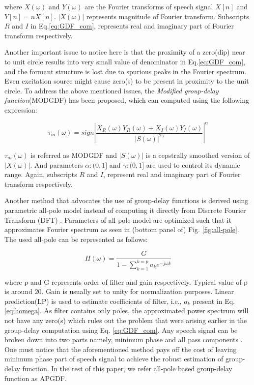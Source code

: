 \documentclass[conference]{IEEEtran}
\begin{document}
where $X(\omega)$ and $Y(\omega)$ are the Fourier transforms of speech signal $X[n]$ and $Y[n] = nX[n]$. $|X(\omega)|$ represents magnitude of Fourier transform. Subscripts $R$ and $I$ in Eq.\ref{eq:GDF_com}, represents real and imaginary part of Fourier transform respectively. 

Another important issue to notice here is that the proximity of a zero(dip) near to unit circle results into very small value of denominator in Eq.\ref{eq:GDF_com}, and the formant structure is lost due to spurious peaks in the Fourier spectrum. Even excitation source might cause zero(s) to be present in proximity to the unit circle. To address the above mentioned issues, the \textit{Modified group-delay function}(MODGDF) has been proposed, which can computed using the following expression:

\begin{equation}
\tau_{m}(\omega) =  sign | \frac{X_R(\omega)Y_R(\omega) + X_I(\omega)Y_I(\omega)}{|S(\omega)|^{2\gamma}} |^{\alpha} 
\label{eq:MODGDF}
\end{equation}

$\tau_{m}(\omega)$  is referred as MODGDF and $|S(\omega)|$ is a cepstrally smoothed version of $|X(\omega)|$. And parameters $\alpha:(0,1]$ and $\gamma:(0,1]$ are used to control its dynamic range. Again, subscripts $R$ and $I$, represent real and imaginary part of Fourier transform respectively. 

Another method that advocates the use of group-delay functions is derived using parametric all-pole model instead of computing it directly from Discrete Fourier Transform (DFT) \cite{allPoleGdSid}. Parameters of all-pole model are optimized such that it approximates Fourier spectrum as seen in (bottom panel of) Fig. \ref{fig:all-pole}. The used all-pole can be represented as follows: 

\begin{equation}
H(\omega) =  \frac{G}{1 - \sum_{k=1}^{k = p} a_k e^{-j\omega k} }
\label{eq:homega}
\end{equation}

where p and G represents order of filter and gain respectively. Typical value of p is around $20$. Gain is usually set to unity for normalization purposes. Linear prediction(LP) is used to estimate coefficients of filter, i.e., $a_k$ present in Eq. \ref{eq:homega}. As filter contains only poles, the approximated power spectrum will not have any zero(s) which rules out the problem that were arising earlier in the group-delay computation using Eq. \ref{eq:GDF_com}. Any speech signal can be broken down into two parts namely, minimum phase and all pass components \cite{allPoleGdSid}. One must notice that the aforementioned method pays off the cost of leaving minimum phase part of speech signal to achieve the robust estimation of group-delay function. In the rest of this paper, we refer all-pole based group-delay function as APGDF.
\end{document}
